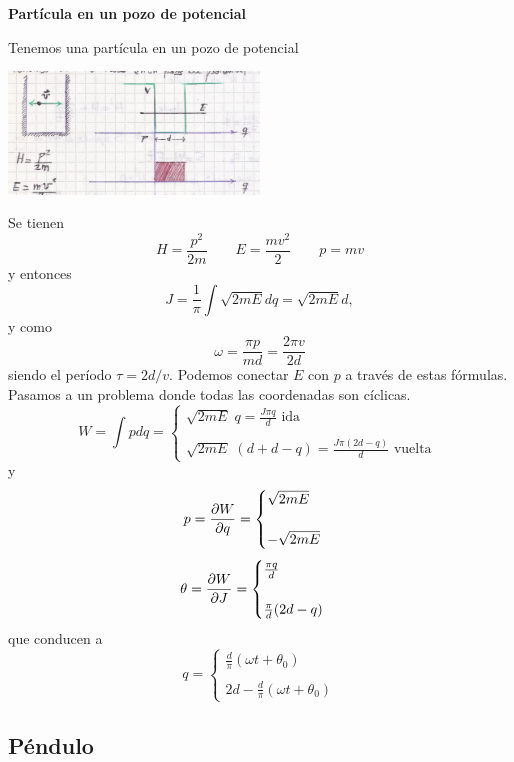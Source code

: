 \documentclass[10pt,oneside]{CBFT_book}
\begin{document}
\begin{ejemplo}{\bf Partícula en un pozo de potencial}

Tenemos una partícula en un pozo de potencial

\includegraphics[width=0.5\textwidth]{images/fig_mc_angacc2.jpg}
 
Se tienen 
\[
	H = \frac{p^2}{2m} \qquad E = \frac{m v^2}{2} \qquad p = m v
\]
y entonces
\[
	J = \frac{1}{\pi} \int \sqrt{2 m E} dq = \sqrt{2 m E} d,
\]
y como 
\[
	\omega = \frac{\pi p}{m d} = \frac{2\pi v}{2d}
\]
siendo el período $\tau = 2d/v$. Podemos conectar $E$ con $p$ a través de estas fórmulas.
Pasamos a un problema donde todas las coordenadas son cíclicas.
\[
	W = \int p dq = \begin{cases}
			\sqrt{ 2 m E } \; q = \frac{J \pi q}{d} \text{ ida } \\
			\\
			\sqrt{ 2 m E } \; ( d + d - q) = \frac{J \pi (2d-q)}{d} \text{ vuelta }
	                \end{cases}
\]
y
\[
	p = \frac{\partial^{\hspace{-0.05em}} {W}}{\partial {q}^{\hspace{-0.05em}}} = \begin{cases}
			\sqrt{ 2 m E } \\
			\\
			-\sqrt{ 2 m E }
	                 \end{cases}
\]
\[
	\theta = \frac{\partial^{\hspace{-0.05em}} {W}}{\partial {J}^{\hspace{-0.05em}}} = \begin{cases}
	                        \frac{\pi q}{d} \\
	                        \\
	                        \frac{\pi}{d}(2d-q)
	                       \end{cases}
\]
que conducen a
\[
	q = \begin{cases}
		\frac{d}{\pi} ( \omega t + \theta_0 ) \\
		\\
		2d - \frac{d}{\pi} ( \omega t + \theta_0 )
	    \end{cases}
\]
 
\end{ejemplo}


\subsection{Péndulo}
\end{document}
